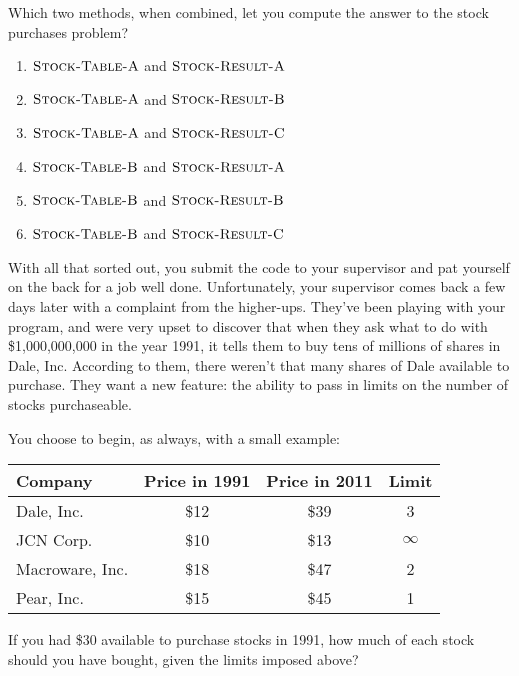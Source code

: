 \documentclass[12pt,twoside]{article}
\newcommand{\answerIIp}{\solution{
5
}}
\newcommand{\answerIIq}{\solution{
3
}}
\begin{document}
\begin{problems}
\begin{problemparts}
\answerIIp

\problempart
{}
Which two methods, when combined,
let you compute the answer to the stock purchases problem?
\begin{enumerate}
\item $\textnormal{\scshape Stock-Table-A}$ and $\textnormal{\scshape Stock-Result-A}$
\item $\textnormal{\scshape Stock-Table-A}$ and $\textnormal{\scshape Stock-Result-B}$
\item $\textnormal{\scshape Stock-Table-A}$ and $\textnormal{\scshape Stock-Result-C}$
\item $\textnormal{\scshape Stock-Table-B}$ and $\textnormal{\scshape Stock-Result-A}$
\item $\textnormal{\scshape Stock-Table-B}$ and $\textnormal{\scshape Stock-Result-B}$
\item $\textnormal{\scshape Stock-Table-B}$ and $\textnormal{\scshape Stock-Result-C}$
\end{enumerate}

\answerIIq

\end{problemparts}

With all that sorted out,
you submit the code to your supervisor
and pat yourself on the back
for a job well done.
Unfortunately, your supervisor comes back
a few days later
with a complaint
from the higher-ups.
They've been playing with your program,
and were very upset to discover that when they ask what to do
with \$1,000,000,000 in the year 1991,
it tells them to buy tens of millions of shares
in Dale, Inc.
According to them,
there weren't that many shares of Dale
available to purchase.
They want a new feature:
the ability to pass in limits
on the number of stocks purchaseable.

You choose to begin,
as always,
with a small example:
\begin{center}
\begin{tabular}{|l|c|c|c|}
\hline
\bf Company & \bf Price in 1991 & \bf Price in 2011 & \bf Limit \\ \hline
Dale, Inc. & \$12 & \$39 & 3 \\
JCN Corp. & \$10 & \$13 & $\infty$ \\
Macroware, Inc. & \$18 & \$47 & 2 \\
Pear, Inc. & \$15 & \$45 & 1 \\ \hline
\end{tabular}
\end{center}

\begin{problemparts}

\problempart
{}
If you had \$30 available to purchase stocks in 1991,
how much of each stock should you have bought,
given the limits imposed above?


\end{problemparts}
\end{problems}
\end{document}

